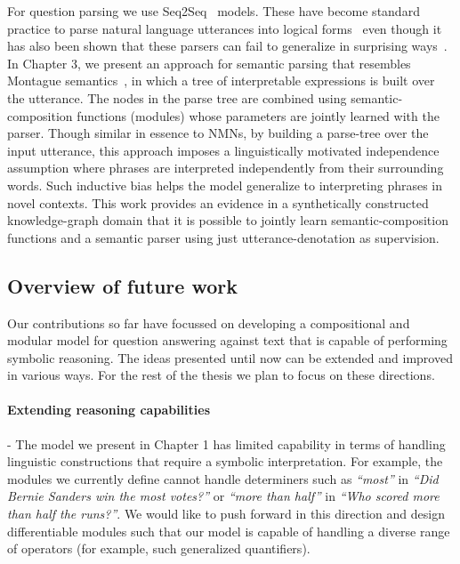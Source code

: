 \documentclass[main.tex]{subfiles}
\begin{document}
For question parsing we use Seq2Seq~\cite{seq2seq-2014,seq2seq-attn-2015} models. These have become standard practice to parse natural language utterances into logical forms~\cite{dong-lapata-2016,krishnamurthy-wikitable-2017,iyer-code-2018} even though it has also been shown that these parsers can fail to generalize in surprising ways~\cite{text2sql-2018,sys-generalization-2018}.
In Chapter 3, we present an approach for semantic parsing that resembles Montague semantics~\cite{montague-semantics}, in which a tree of interpretable expressions is built over the utterance.  The nodes in the parse tree are combined using semantic-composition functions (modules) whose parameters are jointly learned with the parser.  Though similar in essence to NMNs, by building a parse-tree over the input utterance, this approach imposes a linguistically motivated independence assumption where phrases are interpreted independently from their surrounding words.  Such inductive bias helps the model generalize to interpreting phrases in novel contexts.  This work provides an evidence in a synthetically constructed knowledge-graph domain that it is possible to jointly learn semantic-composition functions and a semantic parser using just utterance-denotation as supervision.

\subsection{Overview of future work}

Our contributions so far have focussed on developing a compositional and modular model for question answering against text that is capable of performing symbolic reasoning. The ideas presented until now can be extended and improved in various ways. For the rest of the thesis we plan to focus on these directions.

\paragraph{Extending reasoning capabilities} - The model we present in Chapter 1 has limited capability in terms of handling linguistic constructions that require a symbolic interpretation.  For example, the modules we currently define cannot handle determiners such as \textit{``most''} in \textit{``Did Bernie Sanders win the most votes?''} or \textit{``more than half''} in \textit{``Who scored more than half the runs?''}. We would like to push forward in this direction and design differentiable modules such that our model is capable of handling a diverse range of operators (for example, such generalized quantifiers).
\end{document}
